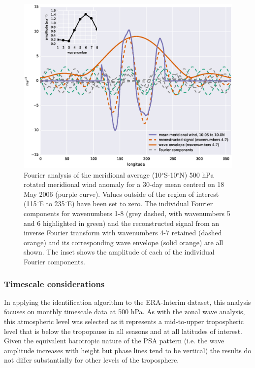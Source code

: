 \begin{figure}
\begin{center}
\includegraphics[width=0.84\columnwidth]{figures/psa/psa_check_2006-05-18_10S-10N_hilbert.eps}
\caption[Fourier analysis of the meridional average (10$^{\circ}$S-10$^{\circ}$N) 500 hPa rotated meridional wind anomaly for a 30-day mean centred on 18 May 2006]{\label{fig:transform}
Fourier analysis of the meridional average (10$^{\circ}$S-10$^{\circ}$N) 500 hPa rotated meridional wind anomaly for a 30-day mean centred on 18 May 2006 (purple curve). Values outside of the region of interest (115$^{\circ}$E to 235$^{\circ}$E) have been set to zero. The individual Fourier components for wavenumbers 1-8 (grey dashed, with wavenumbers 5 and 6 highlighted in green) and the reconstructed signal from an inverse Fourier transform with wavenumbers 4-7 retained (dashed orange) and its corresponding wave envelope (solid orange) are all shown. The inset shows the amplitude of each of the individual Fourier components.
}
\end{center}
\end{figure}

\subsubsection{Timescale considerations}

In applying the identification algorithm to the ERA-Interim dataset, this analysis focuses on monthly timescale data at 500 hPa. As with the zonal wave analysis, this atmospheric level was selected as it represents a mid-to-upper tropospheric level that is below the tropopause in all seasons and at all latitudes of interest. Given the equivalent barotropic nature of the PSA pattern (i.e. the wave amplitude increases with height but phase lines tend to be vertical) the results do not differ substantially for other levels of the troposphere. 

